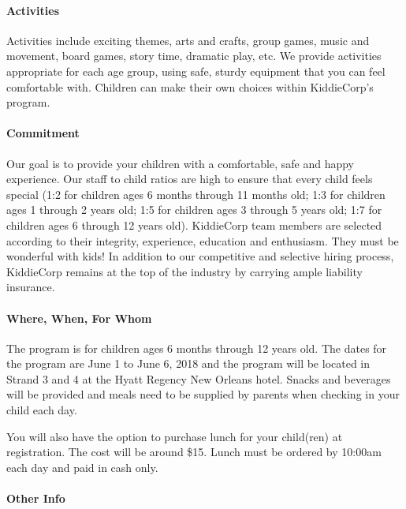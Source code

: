 \paragraph{Activities} Activities include exciting themes, arts  and  crafts, group games, music
and  movement, board games, story time, dramatic play, etc. We provide
activities appropriate for each age group, using safe, sturdy equipment that
you can feel comfortable with. Children can make their own choices within
KiddieCorp's program.


\paragraph{Commitment} Our goal is to provide your children with a comfortable, safe and happy
experience. Our staff to child ratios are high to ensure that every child
feels special (1:2 for children ages 6 months through 11 months old; 1:3 for
children ages 1 through 2 years old; 1:5 for children ages 3 through 5 years
old; 1:7 for children ages 6 through 12 years old). KiddieCorp team members
are selected according to their integrity, experience, education and
enthusiasm. They must be wonderful with kids! In addition to our competitive
and selective hiring process, KiddieCorp remains at the top of the industry
by carrying ample liability insurance.


\paragraph{Where, When, For Whom} The program is for children ages 6 months through 12 years old. The dates
for the program are June 1 to June 6, 2018 and the program will be located in Strand 3 and 4 at the Hyatt Regency New Orleans hotel.  Snacks and beverages
will be provided and meals need to be supplied by parents when checking in
your child each day.

You will also have the option to purchase lunch for your child(ren) at
registration. The cost will be around \$15. Lunch must be ordered by 10:00am each day and
paid in cash only. 


\paragraph{Other Info}


